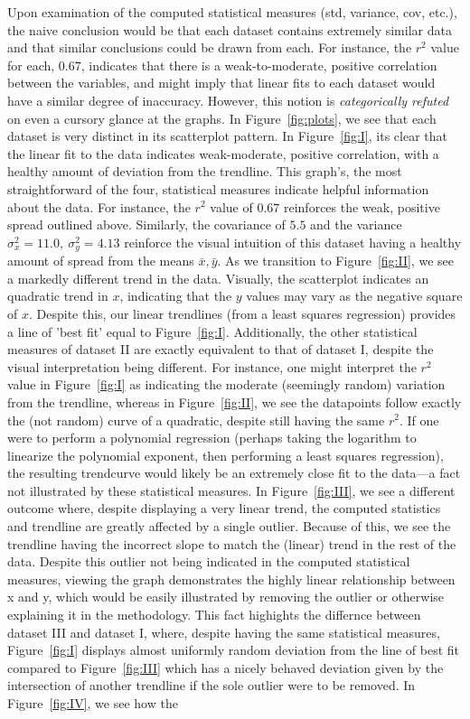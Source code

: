 \documentclass[11pt,a4paper]{article}
\begin{document}
Upon examination of the computed statistical measures (std, variance, cov, etc.), the naive conclusion would be that each dataset contains extremely similar data and that similar conclusions could be drawn from each. For instance, the $r^2$ value for each, $0.67$, indicates that there is a weak-to-moderate, positive correlation between the variables, and might imply that linear fits to each dataset would have a similar degree of inaccuracy. However, this notion is \textit{categorically refuted} on even a cursory glance at the graphs. In Figure~\ref{fig:plots}, we see that each dataset is very distinct in its scatterplot pattern. In Figure~\ref{fig:I}, its clear that the linear fit to the data indicates weak-moderate, positive correlation, with a healthy amount of deviation from the trendline. This graph's, the most straightforward of the four, statistical measures indicate helpful information about the data. For instance, the $r^2$ value of $0.67$ reinforces the weak, positive spread outlined above. Similarly, the covariance of $5.5$ and the variance $\sigma_x^2 = 11.0,\ \sigma_y^2 = 4.13$ reinforce the visual intuition of this dataset having a healthy amount of spread from the means $\bar{x}, \bar{y}$. 
As we transition to Figure~\ref{fig:II}, we see a markedly different trend in the data. Visually, the scatterplot indicates an quadratic trend in $x$, indicating that the $y$ values may vary as the negative square of $x$. Despite this, our linear trendlines (from a least squares regression) provides a line of 'best fit' equal to Figure~\ref{fig:I}. Additionally, the other statistical measures of dataset II are exactly equivalent to that of dataset I, despite the visual interpretation being different. For instance, one might interpret the $r^2$ value in Figure~\ref{fig:I} as indicating the moderate (seemingly random) variation from the trendline, whereas in Figure~\ref{fig:II}, we see the datapoints follow exactly the (not random) curve of a quadratic, despite still having the same $r^2$. If one were to perform a polynomial regression (perhaps taking the logarithm to linearize the polynomial exponent, then performing a least squares regression), the resulting trendcurve would likely be an extremely close fit to the data---a fact not illustrated by these statistical measures. 
In Figure~\ref{fig:III}, we see a different outcome where, despite displaying a very linear trend, the computed statistics and trendline are greatly affected by a single outlier. Because of this, we see the trendline having the incorrect slope to match the (linear) trend in the rest of the data. Despite this outlier not being indicated in the computed statistical measures, viewing the graph demonstrates the highly linear relationship between x and y, which would be easily illustrated by removing the outlier or otherwise explaining it in the methodology. This fact highights the differnce between dataset III and dataset I, where, despite having the same statistical measures, Figure~\ref{fig:I} displays almost uniformly random deviation from the line of best fit compared to Figure~\ref{fig:III} which has a nicely behaved deviation given by the intersection of another trendline if the sole outlier were to be removed.
In Figure~\ref{fig:IV}, we see how the 
\end{document}
